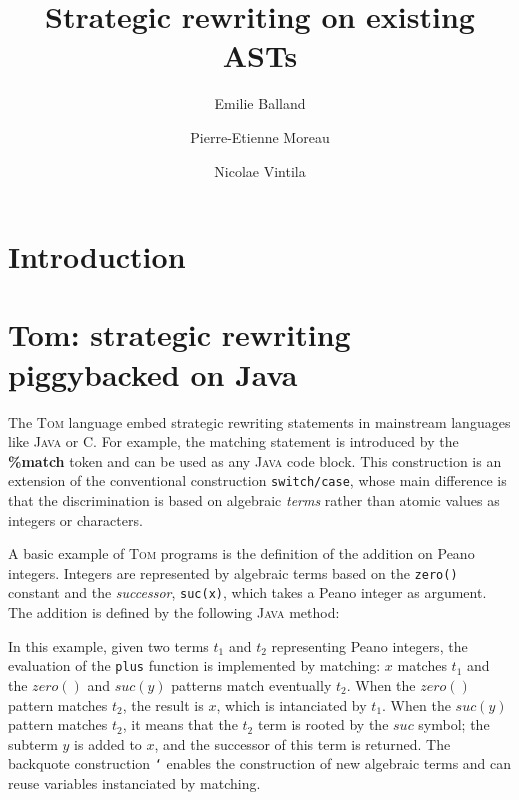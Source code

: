 \documentclass[runningheads]{llncs}
\title{Strategic rewriting on existing ASTs}
\author{Emilie Balland \and Pierre-Etienne Moreau \and Nicolae Vintila}
\institute{INRIA \& LORIA,\\
  BP 101, 54602 Villers-l{\`e}s-Nancy Cedex France\\
\email{\{Emilie.Balland,Pierre-Etienne.Moreau\}@loria.fr,nvintila@yahoo.com}}
\newcommand{\tom}{\textsc{Tom}}
\newcommand{\java}{\textsc{Java}}
\newcommand{\C}{\textsf{C}}
\newcommand{\lex}[1]{{\textrm{\textbf{#1}}}}
\begin{document}
\maketitle

\begin{abstract}

\end{abstract}

\section{Introduction}

\section{Tom: strategic rewriting piggybacked on Java}
	
The {\tom} language embed strategic rewriting statements in  mainstream
languages like {\java} or {\C}.  For example, the matching statement is
introduced by the \lex{\%match} token and can be used as any {\java} code
block.  This construction is an extension of the conventional construction
\texttt{switch/case}, whose main difference is that the discrimination is
based on algebraic \emph{terms} rather than atomic values as integers or
characters.

A basic example of {\tom} programs is the definition of the addition on Peano
integers. Integers are represented by algebraic terms based on the
\texttt{zero()} constant and the \emph{successor}, \texttt{suc(x)},  which
takes a Peano integer as argument.  The addition is defined by the following
{\java} method:

\medskip
{}

In this example, given two terms  $t_1$ and $t_2$ representing Peano integers,
the evaluation of the \texttt{plus} function is implemented by matching: $x$
matches $t_1$ and the $zero()$ and $suc(y)$ patterns match eventually $t_2$.
When the $zero()$ pattern matches $t_2$, the result is $x$, which
is intanciated by $t_1$. When the $suc(y)$ pattern matches $t_2$, it means
that the $t_2$ term is rooted by the $suc$ symbol; the subterm $y$ is added
to $x$, and the successor of this term is returned. The backquote construction
\texttt{`} enables the construction of new algebraic terms and can reuse
variables instanciated by matching.
\end{document}
